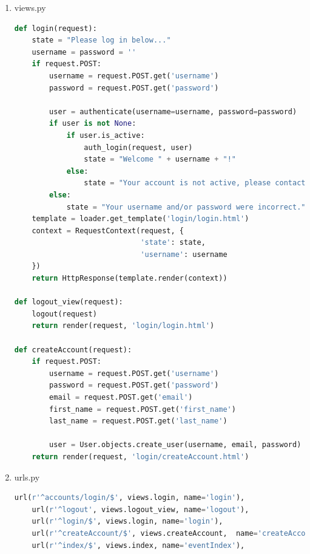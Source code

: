\documentclass[letterpaper,10pt,onecolumn]{IEEEtran} %
\begin{document}
\begin{enumerate}
\item views.py
\begin{center}
\begin{lstlisting}[language=Python]
def login(request):
    state = "Please log in below..."
    username = password = ''
    if request.POST:
        username = request.POST.get('username')
        password = request.POST.get('password')

        user = authenticate(username=username, password=password)
        if user is not None:
            if user.is_active:
                auth_login(request, user)
                state = "Welcome " + username + "!"
            else:
                state = "Your account is not active, please contact the site admin."
        else:
            state = "Your username and/or password were incorrect."
    template = loader.get_template('login/login.html')
    context = RequestContext(request, {
                             'state': state,
                             'username': username
    })
    return HttpResponse(template.render(context))

def logout_view(request):
    logout(request)
    return render(request, 'login/login.html')

def createAccount(request):
    if request.POST:
        username = request.POST.get('username')
        password = request.POST.get('password')
        email = request.POST.get('email')
        first_name = request.POST.get('first_name')
        last_name = request.POST.get('last_name')

        user = User.objects.create_user(username, email, password)
    return render(request, 'login/createAccount.html')

\end{lstlisting}
\end{center}

\item urls.py
\begin{center}
\begin{lstlisting}[language=Python]
    url(r'^accounts/login/$', views.login, name='login'),
    url(r'^logout', views.logout_view, name='logout'),
    url(r'^login/$', views.login, name='login'),
    url(r'^createAccount/$', views.createAccount,  name='createAccount'),
    url(r'^index/$', views.index, name='eventIndex'),

\end{lstlisting}
\end{center}

\end{enumerate}
\end{document}
